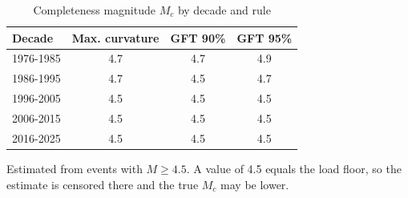 \begin{table}[t]
\centering
\begin{threeparttable}
\caption{Completeness magnitude $M_c$ by decade and rule}
\label{tab:completeness}
\begin{tabular}{lccc}
\toprule
Decade & Max. curvature & GFT 90\% & GFT 95\% \\
\midrule
1976-1985 & 4.7 & 4.7 & 4.9 \\
1986-1995 & 4.7 & 4.5 & 4.7 \\
1996-2005 & 4.5 & 4.5 & 4.5 \\
2006-2015 & 4.5 & 4.5 & 4.5 \\
2016-2025 & 4.5 & 4.5 & 4.5 \\
\bottomrule
\end{tabular}
\begin{tablenotes}[flushleft]
\footnotesize
\item Estimated from events with $M\geq 4.5$. A value of 4.5 equals the load floor, so the estimate is censored there and the true $M_c$ may be lower.
\end{tablenotes}
\end{threeparttable}
\end{table}
